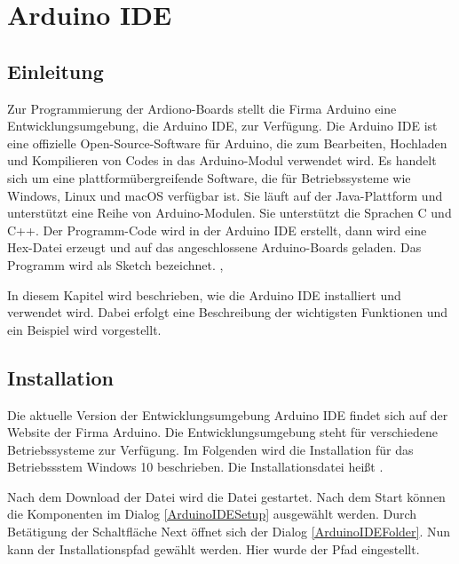 

\chapter{Arduino IDE}

\section{Einleitung}

Zur Programmierung der Ardiono-Boards stellt die Firma Arduino eine Entwicklungsumgebung, die Arduino IDE, zur Verfügung. Die Arduino IDE ist eine offizielle Open-Source-Software für Arduino, die zum Bearbeiten, Hochladen und Kompilieren von Codes in das Arduino-Modul verwendet wird. Es handelt sich um eine plattformübergreifende Software, die für Betriebssysteme wie Windows, Linux und macOS verfügbar ist. Sie läuft auf der Java-Plattform und unterstützt eine Reihe von Arduino-Modulen. Sie unterstützt die Sprachen C und C++. Der Programm-Code wird in der Arduino IDE erstellt, dann wird eine Hex-Datei erzeugt und  auf das angeschlossene Arduino-Boards geladen. Das Programm wird als Sketch bezeichnet. 
\cite{Arduino:2022},  \cite{ArduinoIDE:2022} 

In diesem Kapitel wird beschrieben, wie die Arduino IDE installiert und verwendet wird. Dabei erfolgt eine Beschreibung der wichtigsten Funktionen und ein Beispiel wird vorgestellt.



\section{Installation}

Die aktuelle Version der Entwicklungsumgebung Arduino IDE findet sich auf der Website der Firma Arduino. \cite{ArduinoIDE:2022} Die Entwicklungsumgebung steht für verschiedene Betriebssysteme zur Verfügung. Im Folgenden wird die Installation für das Betriebssstem Windows 10 beschrieben. Die Installationsdatei heißt . 

Nach dem Download der Datei wird die Datei gestartet. Nach dem Start können die Komponenten im Dialog \ref{ArduinoIDESetup} ausgewählt werden. Durch Betätigung der Schaltfläche \glqq Next\grqq{} öffnet sich der Dialog \ref{ArduinoIDEFolder}. Nun kann der Installationspfad gewählt werden. Hier wurde der Pfad   eingestellt.

